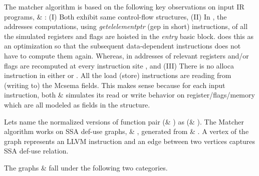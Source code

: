 The matcher algorithm is based on the following key observations on input IR 
programs,  \& : (I) Both exhibit same control-flow 
structures, (II) In \T, the addresses computations, using 
\emph{getelelementptr} (gep in short) instructions, of all the simulated 
registers 
and flags  
are hoisted in the \emph{entry} basic block. \mcsema does this as an 
optimization so that  the subsequent data-dependent  
instructions does not have to compute them again. 
Whereas, in \TP  addresses of relevant registers and/or flags are recomputed at 
every instruction site
, and 
(III) There is no alloca instruction in either \T or \TP. All the load 
(store) 
instructions are reading from 
(writing to) the Mcsema \Mcstate fields. This makes sense because for each 
input \ISA instruction, both \T \& \TP simulates its read or write behavior on 
register/flags/memory which are all modeled as fields in the \Mcstate 
structure.



Lets name the normalized versions of function pair (\F \& \FP) as (\FN \& 
\FNP).
The Matcher algorithm works on SSA def-use graphs, 
\GN \& \GNP,  generated  
from \FN \& \FNP. A vertex of the graph represents an 
LLVM instruction and an edge between two vertices captures SSA def-use 
relation. 

The graphs \GN \& \GNP fall under the following two categories. 
